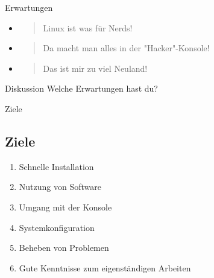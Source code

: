 \begin{frame}{Erwartungen}
    \begin{itemize}
        \item \begin{quote}
                  Linux ist was für Nerds!
        \end{quote}\pause
        \item \begin{quote}
                  Da macht man alles in der "Hacker"-Konsole!
        \end{quote}\pause
        \item \begin{quote}
                  Das ist mir zu viel Neuland!
        \end{quote}
    \end{itemize}

    \pause
    \vspace{0.5cm}
    \begin{alertblock}{Diskussion}
        Welche Erwartungen hast du?
    \end{alertblock}

\end{frame}

\begin{frame}{Ziele}
    \subsection{Ziele}\label{subsec:ziele}

    \begin{enumerate}
        \item Schnelle Installation\pause
        \item Nutzung von Software\pause
        \item Umgang mit der Konsole\pause
        \item Systemkonfiguration\pause
        \item Beheben von Problemen\pause
        \item Gute Kenntnisse zum eigenständigen Arbeiten\pause
    \end{enumerate}

\end{frame}